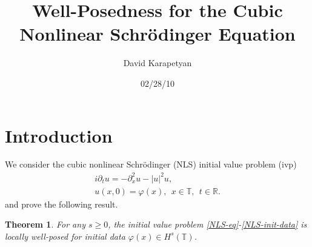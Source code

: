 \documentclass[12pt,reqno]{amsart}
\newcommand{\rr}{\mathbb{R}}
\newcommand{\p}{\partial}
\newcommand{\ci}{\mathbb{T}}
\newcommand{\vp}{\varphi}
\theoremstyle{plain}  %
\newtheorem{theorem}{Theorem}
\begin{document}
\title{Well-Posedness for the Cubic Nonlinear Schr\"{o}dinger Equation }
\author{David Karapetyan}
\address{Department of Mathematics  \\
         University  of Notre Dame\\
		          Notre Dame, IN 46556 }
				  \date{02/28/10}
				  \maketitle
				  \parindent0in
				  \parskip0.1in
				  \section{Introduction}
				  \setcounter{equation}{0}
				  We consider the cubic nonlinear Schr\"{o}dinger (NLS) 
				  initial value problem (ivp)
%
%
\begin{gather}
	\label{NLS-eq}
		i \p_t u = - \p_x^2 u - |u|^{2} u,
		\\
		\label{NLS-init-data}
		u(x,0) = \vp(x), \ \ x \in \ci, \ \ t \in \rr.
\end{gather}
%
%
and prove the following result.
%
%
%
%
%
%
%
%
%
%
\begin{theorem}
	\label{thm:main}
	For any $s \ge 0$, the initial value problem 
	\eqref{NLS-eq}-\eqref{NLS-init-data} is locally well-posed for 
	initial data $\vp(x) \in H^s(\ci)$.
%
%
\end{theorem} 
%
%
%
%
%
%
%
%
%
%
\end{document}
